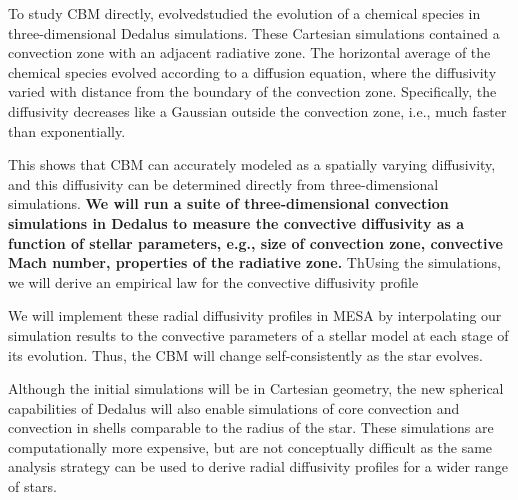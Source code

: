 To study CBM directly, \citet{Lecoanet_2016a} evolvedstudied the evolution of a chemical species in three-dimensional Dedalus simulations.  These Cartesian simulations contained a convection zone with an adjacent radiative zone. The horizontal average of the chemical species evolved according to a diffusion equation, where the diffusivity varied with distance from the boundary of the convection zone. Specifically, the diffusivity decreases like a Gaussian outside the convection zone, i.e., much faster than exponentially.

This shows that CBM can accurately modeled as a spatially varying diffusivity, and this diffusivity can be determined directly from three-dimensional simulations. \textbf{We will run a suite of three-dimensional convection simulations in Dedalus to measure the convective diffusivity as a function of stellar parameters, e.g., size of convection zone, convective Mach number, properties of the radiative zone.} ThUsing the simulations, we will derive an empirical law for the convective diffusivity profile 

We will implement these radial diffusivity profiles in MESA by interpolating our simulation results to the convective parameters of a stellar model at each stage of its evolution. Thus, the CBM will change self-consistently as the star evolves.

Although the initial simulations will be in Cartesian geometry, the new spherical capabilities of Dedalus will also enable simulations of core convection and convection in shells comparable to the radius of the star. These simulations are computationally more expensive, but are not conceptually difficult as the same analysis strategy can be used to derive radial diffusivity profiles for a wider range of stars.

